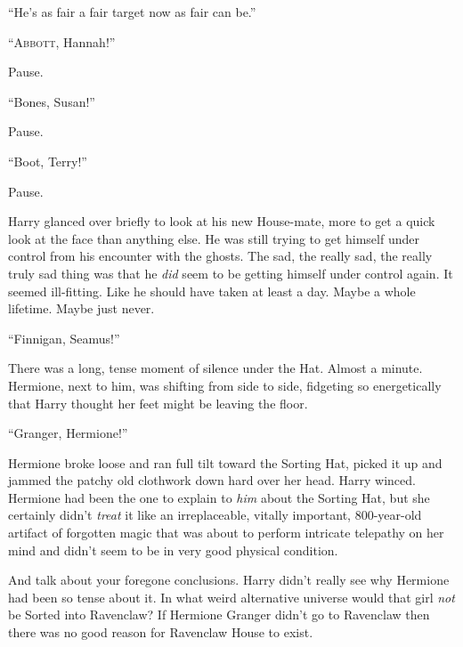
\epigraph{“He’s as fair a fair target now as fair can be.”}{}

\lettrine[lraise=.1]{“A}{bbott,} Hannah!”

\quad\quad %
Pause.


“Bones, Susan!”

Pause.


“Boot, Terry!”

Pause.


Harry glanced over briefly to look at his new House-mate, more to get a quick look at the face than anything else. He was still trying to get himself under control from his encounter with the ghosts. The sad, the really sad, the really truly sad thing was that he \emph{did} seem to be getting himself under control again. It seemed ill-fitting. Like he should have taken at least a day. Maybe a whole lifetime. Maybe just never.

“Finnigan, Seamus!”

There was a long, tense moment of silence under the Hat. Almost a minute. Hermione, next to him, was shifting from side to side, fidgeting so energetically that Harry thought her feet might be leaving the floor.


“Granger, Hermione!”

Hermione broke loose and ran full tilt toward the Sorting Hat, picked it up and jammed the patchy old clothwork down hard over her head. Harry winced. Hermione had been the one to explain to \emph{him} about the Sorting Hat, but she certainly didn’t \emph{treat} it like an irreplaceable, vitally important, 800-year-old artifact of forgotten magic that was about to perform intricate telepathy on her mind and didn’t seem to be in very good physical condition.


And talk about your foregone conclusions. Harry didn’t really see why Hermione had been so tense about it. In what weird alternative universe would that girl \emph{not} be Sorted into Ravenclaw? If Hermione Granger didn’t go to Ravenclaw then there was no good reason for Ravenclaw House to exist.

